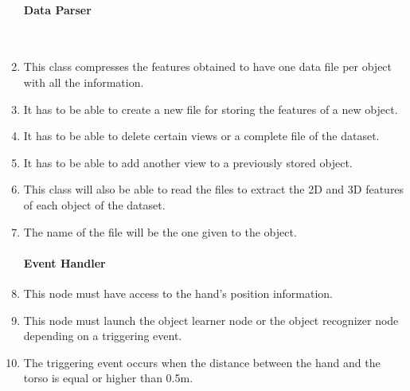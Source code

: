 \begin{enumerate}[label=\textbf{FR\threedigits*}, leftmargin=2cm]
\paragraph{Data Parser}\mbox{}\\
\item This class compresses the features obtained to have one data file per object with all the information.
 
\item It has to be able to create a new file for storing the features of a new object. 
\item It has to be able to delete certain views or a complete file of the dataset. 
\item It has to be able to add another view to a previously stored object. 

\item This class will also be able to read the files to extract the 2D and 3D features of each object of the dataset. 

\item The name of the file will be the one given to the object. 

			
		
	


 
\paragraph{Event Handler}
\item This node must have access to the hand's position information. 
\item This node must launch the object learner node or the object recognizer node depending on a triggering event. 
\item The triggering event occurs when the distance between the hand and the torso is equal or higher than 0.5m.   
 


\end{enumerate}
